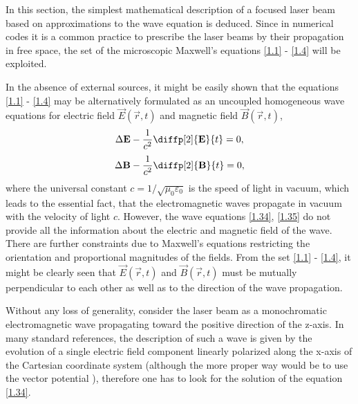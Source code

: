 In this section, the simplest mathematical description of a focused laser beam based on approximations to the wave equation is deduced. Since in numerical codes it is a common practice to prescribe the laser beams by their propagation in free space, the set of the microscopic Maxwell's equations \ref{1.1} - \ref{1.4} will be exploited.

In the absence of external sources, it might be easily shown that the equations \ref{1.1} - \ref{1.4} may be alternatively formulated as an uncoupled homogeneous wave equations for electric field $ \vec{E}\left( \vec{r}, t \right) $ and magnetic field $ \vec{B}\left( \vec{r}, t \right) $,
\begin{equation}
\label{1.34}
\laplace{\vec{E}} - \frac{1}{c^{2}} \diffp[2]{\vec{E}}{t} = 0,
\end{equation}
\begin{equation}
\label{1.35}
\laplace{\vec{B}} - \frac{1}{c^{2}} \diffp[2]{\vec{B}}{t} = 0,
\end{equation}
where the universal constant $ c = 1/\sqrt{\mu_0 \varepsilon_0} $ is the speed of light in vacuum, which leads to the essential fact, that the electromagnetic waves propagate in vacuum with the velocity of light $ c $. However, the wave equations \ref{1.34}, \ref{1.35} do not provide all the information about the electric and magnetic field of the wave. There are further constraints due to Maxwell's equations restricting the orientation and proportional magnitudes of the fields. From the set \ref{1.1} - \ref{1.4}, it might be clearly seen that $ \vec{E}\left( \vec{r}, t \right) $ and $ \vec{B}\left( \vec{r}, t \right) $ must be mutually perpendicular to each other as well as to the direction of the wave propagation. 

Without any loss of generality, consider the laser beam as a monochromatic electromagnetic wave propagating toward the positive direction of the z-axis. In many standard references, the description of such a wave is given by the evolution of a single electric field component linearly polarized along the x-axis of the Cartesian coordinate system \cite{Siegman1986, Milonni1988, Yariv1989, Svelto2010, Galvez2006} (although the more proper way would be to use the vector potential \cite{Davis1979, Davis1981, Guenther1990, Salamin2006, Vaveliuk2007}), therefore one has to look for the solution of the equation \ref{1.34}. 

